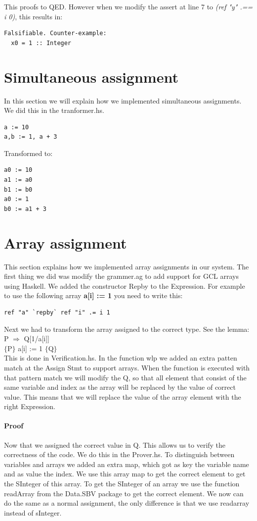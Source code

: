 \documentclass{article}
\begin{document}
This proofs to QED. However when we modify the assert at line 7 to \textit{(ref "y" .== i 0)}, this results in:
\begin{lstlisting}
Falsifiable. Counter-example:
  x0 = 1 :: Integer
\end{lstlisting}


\section{Simultaneous assignment}
In this section we will explain how we implemented simultaneous assignments. We did this in the tranformer.hs.
\begin{lstlisting}
a := 10
a,b := 1, a + 3
\end{lstlisting} 

Transformed to:
\begin{lstlisting}
a0 := 10
a1 := a0
b1 := b0
a0 := 1
b0 := a1 + 3
\end{lstlisting} 

\section{Array assignment}
This section explains how we implemented array assignments in our system. The first thing we did was modify the grammer.ag to add support for GCL arrays using Haskell. We added the constructor Repby to the Expression. For example to use the following array \textbf{a[i] := 1} you need to write this:
\begin{lstlisting}
ref "a" `repby` ref "i" .= i 1
\end{lstlisting}
Next we had to transform the array assigned to the correct type. See the lemma:
\\
P $\Rightarrow$ Q[1/a[i]]\\
$\{$P$\}$ a[i] := 1 $\{$Q$\}$\\

This is done in Verification.hs. In the function wlp we added an extra patten match at the Assign Stmt to support arrays. When the function is executed with that pattern match we will modify the Q, so that all element that consist of the same variable and index as the array will be replaced by the value of correct value. This means that we will replace the value of the array element with the right Expression.


\paragraph{Proof}
Now that we assigned the correct value in Q. This allows us to verify the correctness of the code. We do this in the Prover.hs. To distinguish between variables and arrays we added an extra map, which got as key the variable name and as value the index. We use this array map to get the correct element to get the SInteger of this array. To get the SInteger of an array we use the function readArray from the Data.SBV package to get the correct element. We now can do the same as a normal assignment, the only difference is that we use readarray instead of sInteger. 
\end{document}
